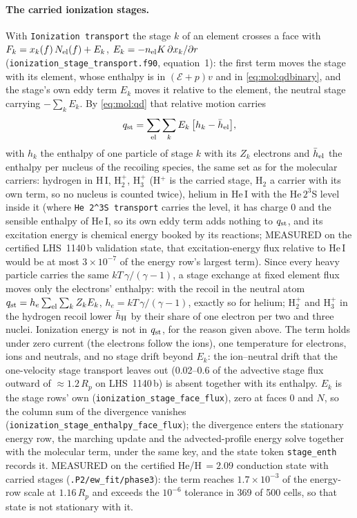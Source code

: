 \paragraph{The carried ionization stages.}  With \texttt{Ionization
transport} the stage $k$ of an element crosses a face with
$F_k = x_k(f)\,N_{\rm el}(f) + E_k$, $E_k = -n_{\rm el}K\,\partial x_k/\partial r$
(\texttt{ionization\_stage\_transport.f90}, equation~1): the first term
moves the stage with its element, whose enthalpy is in $(\mathcal{E}+p)v$ and
in \eqref{eq:mol:qdbinary}, and the stage's own eddy term $E_k$ moves it
relative to the element, the neutral stage carrying $-\sum_k E_k$.  By
\eqref{eq:mol:qd} that relative motion carries
%
\begin{equation}
  q_{\rm st} = \sum_{\rm el}\sum_k E_k\,\bigl[h_k - \bar h_{\rm el}\bigr],
  \label{eq:mol:qst}
\end{equation}
%
with $h_k$ the enthalpy of one particle of stage $k$ with its $Z_k$ electrons
and $\bar h_{\rm el}$ the enthalpy per nucleus of the recoiling species, the
same set as for the molecular carriers: hydrogen in H\,I, H$_2^+$, H$_3^+$
(H$^+$ is the carried stage, H$_2$ a carrier with its own term, so no nucleus
is counted twice), helium in He\,I with the He\,$2^3$S level inside it
(where \texttt{He 2\^{}3S transport} carries the level, it has charge 0 and
the sensible enthalpy of He\,I, so its own eddy term adds nothing to
$q_{\rm st}$, and its excitation energy is chemical energy booked by its
reactions; MEASURED on the certified LHS~1140\,b validation state, that
excitation-energy flux relative to He\,I would be at most
$3\times10^{-7}$ of the energy row's largest term).
Since every heavy particle carries the same $kT\,\gamma/(\gamma-1)$, a stage
exchange at fixed element flux moves only the electrons' enthalpy: with the
recoil in the neutral atom $q_{\rm st} = h_e\sum_{\rm el}\sum_k Z_kE_k$,
$h_e = kT\,\gamma/(\gamma-1)$, exactly so for helium; H$_2^+$ and H$_3^+$ in
the hydrogen recoil lower $\bar h_{\rm H}$ by their share of one electron per
two and three nuclei.  Ionization energy is not in $q_{\rm st}$, for the reason
given above.  The term holds under zero current (the electrons follow the
ions), one temperature for electrons, ions and neutrals, and no stage drift
beyond $E_k$: the ion--neutral drift that the one-velocity stage transport
leaves out (0.02--0.6 of the advective stage flux outward of
$\approx1.2\,R_p$ on LHS~1140\,b) is absent together with its enthalpy.
$E_k$ is the stage rows' own (\texttt{ionization\_stage\_face\_flux}), zero at
faces 0 and $N$, so the column sum of the divergence vanishes
(\texttt{ionization\_stage\_enthalpy\_face\_flux}); the divergence enters the
stationary energy row, the marching update and the advected-profile energy
solve together with the molecular term, under the same key, and the state
token \texttt{stage\_enth} records it.  MEASURED on the certified He/H\,$=2.09$
conduction state with carried stages (\texttt{.P2/ew\_fit/phase3}): the term
reaches $1.7\times10^{-3}$ of the energy-row scale at $1.16\,R_p$ and exceeds
the $10^{-6}$ tolerance in 369 of 500 cells, so that state is not stationary
with it.
